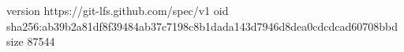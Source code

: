 version https://git-lfs.github.com/spec/v1
oid sha256:ab39b2a81df8f39484ab37c7198c8b1dada143d7946d8dea0cdcdcad60708bbd
size 87544
